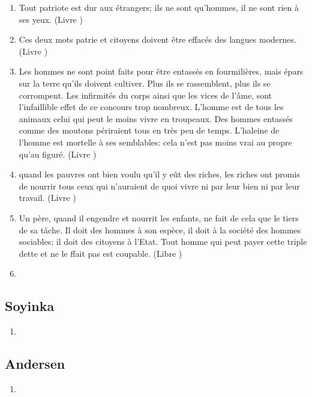 \documentclass[a4paper, 11pt, hidelinks]{article}
\newcommand{\rb}[1]{\Romanbar{#1}}
\begin{document}
\begin{enumerate}
    \item Tout patriote est dur aux étrangers; ils ne sont qu'hommes, il ne sont rien à ses yeux. (Livre \rb{1})
    \item Ces deux mots patrie et citoyens doivent être effacés des langues modernes. (Livre \rb{1})
    \item Les hommes ne sont point faits pour être entassés en fourmilières, mais épars sur la terre qu'ils doivent cultiver. Plus ils se rassemblent, plus ils se corrompent. Les infirmités du corps ainsi que les vices de l'âme, sont l'infaillible effet de ce concours trop nombreux. L'homme est de tous les animaux celui qui peut le moins vivre en troupeaux. Des hommes entassés comme des moutons périraient tous en très peu de temps. L'haleine de l'homme est mortelle à ses semblables: cela n'est pas moins vrai au propre qu'au figuré. (Livre \rb{1})
    \item quand les pauvres ont bien voulu qu'il y eût des riches, les riches ont promis de nourrir tous ceux qui n'auraient de quoi vivre ni par leur bien ni par leur travail. (Livre \rb{2})
    \item Un père, quand il engendre et nourrit les enfants, ne fait de cela que le tiers de sa tâche. Il doit des hommes à son espèce, il doit à la société des hommes sociables; il doit des citoyens à l'Etat. Tout homme qui peut payer cette triple dette et ne le ffait pas est coupable. (Libre \rb{1})
    \item 
\end{enumerate}



\subsection{Soyinka}


\begin{enumerate}
    \item 
\end{enumerate}




\subsection{Andersen}


\begin{enumerate}
    \item 
\end{enumerate}
\end{document}
